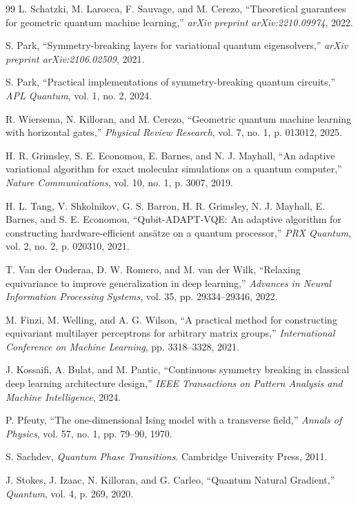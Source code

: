 \documentclass[10pt,twocolumn]{article}
\theoremstyle{remark}
\begin{document}
\begin{thebibliography}{99}
L. Schatzki, M. Larocca, F. Sauvage, and M. Cerezo, ``Theoretical guarantees for geometric quantum machine learning,'' \textit{arXiv preprint arXiv:2210.09974}, 2022.

S. Park, ``Symmetry-breaking layers for variational quantum eigensolvers,'' \textit{arXiv preprint arXiv:2106.02509}, 2021.

S. Park, ``Practical implementations of symmetry-breaking quantum circuits,'' \textit{APL Quantum}, vol. 1, no. 2, 2024.

R. Wiersema, N. Killoran, and M. Cerezo, ``Geometric quantum machine learning with horizontal gates,'' \textit{Physical Review Research}, vol. 7, no. 1, p. 013012, 2025.

H. R. Grimsley, S. E. Economou, E. Barnes, and N. J. Mayhall, ``An adaptive variational algorithm for exact molecular simulations on a quantum computer,'' \textit{Nature Communications}, vol. 10, no. 1, p. 3007, 2019.

H. L. Tang, V. Shkolnikov, G. S. Barron, H. R. Grimsley, N. J. Mayhall, E. Barnes, and S. E. Economou, ``Qubit-ADAPT-VQE: An adaptive algorithm for constructing hardware-efficient ans\"atze on a quantum processor,'' \textit{PRX Quantum}, vol. 2, no. 2, p. 020310, 2021.

T. Van der Ouderaa, D. W. Romero, and M. van der Wilk, ``Relaxing equivariance to improve generalization in deep learning,'' \textit{Advances in Neural Information Processing Systems}, vol. 35, pp. 29334--29346, 2022.

M. Finzi, M. Welling, and A. G. Wilson, ``A practical method for constructing equivariant multilayer perceptrons for arbitrary matrix groups,'' \textit{International Conference on Machine Learning}, pp. 3318--3328, 2021.

J. Kossaifi, A. Bulat, and M. Pantic, ``Continuous symmetry breaking in classical deep learning architecture design,'' \textit{IEEE Transactions on Pattern Analysis and Machine Intelligence}, 2024.

P. Pfeuty, ``The one-dimensional Ising model with a transverse field,'' \textit{Annals of Physics}, vol. 57, no. 1, pp. 79--90, 1970.

S. Sachdev, \textit{Quantum Phase Transitions}. Cambridge University Press, 2011.

J. Stokes, J. Izaac, N. Killoran, and G. Carleo, ``Quantum Natural Gradient,'' \textit{Quantum}, vol. 4, p. 269, 2020.

\end{thebibliography}
\end{document}
